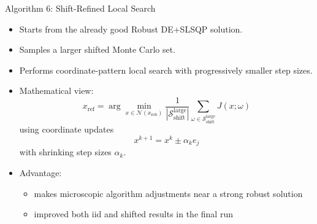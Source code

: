 \documentclass[aspectratio=169]{beamer}
\begin{document}


\begin{frame}{Algorithm 6: Shift-Refined Local Search}
  \small

  \begin{itemize}
    \item Starts from the already good Robust DE+SLSQP solution.
    \item Samples a larger shifted Monte Carlo set.
    \item Performs coordinate-pattern local search with progressively smaller step sizes.
    \item Mathematical view:
    \[
    x_{\mathrm{ref}}
    =
    \arg\min_{x \in \mathcal{N}(x_{\mathrm{rob}})}
    \frac{1}{|\mathcal{S}_{\mathrm{shift}}^{\mathrm{large}}|}
    \sum_{\omega \in \mathcal{S}_{\mathrm{shift}}^{\mathrm{large}}} J(x;\omega)
    \]
    using coordinate updates
    \[
    x^{k+1} = x^k \pm \alpha_k e_j
    \]
    with shrinking step sizes \(\alpha_k\).
    \item Advantage:
    \begin{itemize}
      \item makes microscopic algorithm adjustments near a strong robust solution
      \item improved both iid and shifted results in the final run
    \end{itemize}
  \end{itemize}
\end{frame}
\end{document}
